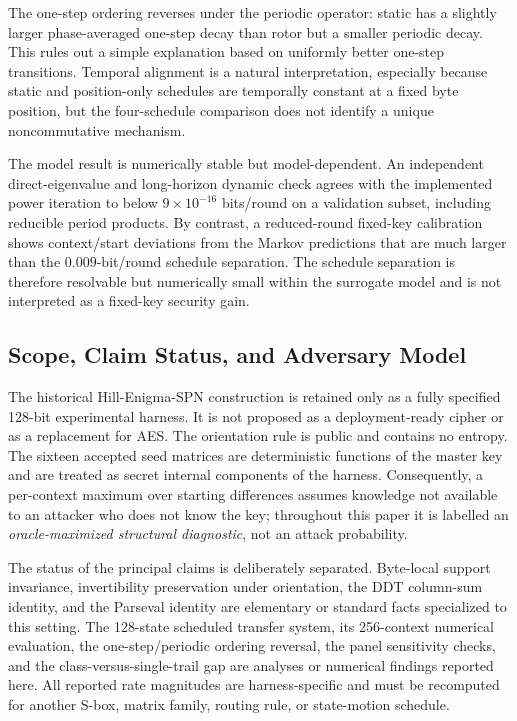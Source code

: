 \documentclass[cryptography,article,submit,oneauthor]{Definitions/mdpi}
\begin{document}
The one-step ordering reverses under the periodic operator: static has a slightly larger phase-averaged one-step decay than rotor but a smaller periodic decay. This rules out a simple explanation based on uniformly better one-step transitions. Temporal alignment is a natural interpretation, especially because static and position-only schedules are temporally constant at a fixed byte position, but the four-schedule comparison does not identify a unique noncommutative mechanism.

The model result is numerically stable but model-dependent. An independent direct-eigenvalue and long-horizon dynamic check agrees with the implemented power iteration to below $9\times10^{-16}$ bits/round on a validation subset, including reducible period products. By contrast, a reduced-round fixed-key calibration shows context/start deviations from the Markov predictions that are much larger than the $0.009$-bit/round schedule separation. The schedule separation is therefore resolvable but numerically small within the surrogate model and is not interpreted as a fixed-key security gain.

\subsection{Scope, Claim Status, and Adversary Model}\label{sec:1-3}
The historical Hill-Enigma-SPN construction is retained only as a fully specified 128-bit experimental harness. It is not proposed as a deployment-ready cipher or as a replacement for AES. The orientation rule is public and contains no entropy. The sixteen accepted seed matrices are deterministic functions of the master key and are treated as secret internal components of the harness. Consequently, a per-context maximum over starting differences assumes knowledge not available to an attacker who does not know the key; throughout this paper it is labelled an \emph{oracle-maximized structural diagnostic}, not an attack probability.

The status of the principal claims is deliberately separated. Byte-local support invariance, invertibility preservation under orientation, the DDT column-sum identity, and the Parseval identity are elementary or standard facts specialized to this setting. The 128-state scheduled transfer system, its 256-context numerical evaluation, the one-step/periodic ordering reversal, the panel sensitivity checks, and the class-versus-single-trail gap are analyses or numerical findings reported here. All reported rate magnitudes are harness-specific and must be recomputed for another S-box, matrix family, routing rule, or state-motion schedule.
\end{document}
